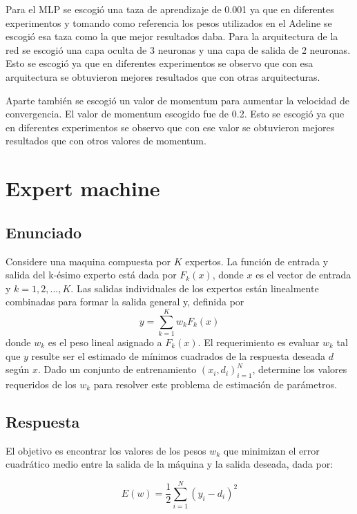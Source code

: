 \documentclass{article}
\theoremstyle{mytheoremstyle}
\theoremstyle{mytheoremstyle}
\theoremstyle{myproblemstyle}
\begin{document}
Para el MLP se escogió una taza de aprendizaje de 0.001 ya que en diferentes experimentos y tomando como referencia los pesos utilizados en el Adeline se escogió esa taza como la que mejor resultados daba. Para la arquitectura de la red se escogió una capa oculta de 3 neuronas y una capa de salida de 2 neuronas. Esto se escogió ya que en diferentes experimentos se observo que con esa arquitectura se obtuvieron mejores resultados que con otras arquitecturas.

Aparte también se escogió un valor de momentum para aumentar la velocidad de convergencia. El valor de momentum escogido fue de 0.2. Esto se escogió ya que en diferentes experimentos se observo que con ese valor se obtuvieron mejores resultados que con otros valores de momentum.


\section{Expert machine}

\subsection{Enunciado}

Considere una maquina compuesta por $K$ expertos. La función de entrada y salida del k-ésimo experto está dada por $F_k(x)$, donde $x$ es el vector de entrada y $k = 1,2, ... , K$. Las salidas individuales de los expertos están linealmente combinadas para formar la salida general y, definida por
\begin{equation*}
  y = \sum_{k=1}^{K}w_kF_k(x)
\end{equation*}
donde $w_k$ es el peso lineal asignado a $F_k(x)$. El requerimiento es evaluar $w_k$ tal que $y$ resulte ser el estimado de mínimos cuadrados de la respuesta deseada $d$ según $x$. Dado un conjunto de entrenamiento ${(x_i, d_i)}_{i=1}^N$, determine los valores requeridos de los $w_k$ para resolver este problema de estimación de parámetros.

\subsection{Respuesta}

El objetivo es encontrar los valores de los pesos $w_k$ que minimizan el error cuadrático medio entre la salida de la máquina y la salida deseada, dada por:

\begin{equation*}
  E(w) = \frac{1}{2}\sum_{i=1}^{N}(y_i - d_i)^2
\end{equation*}
\end{document}
